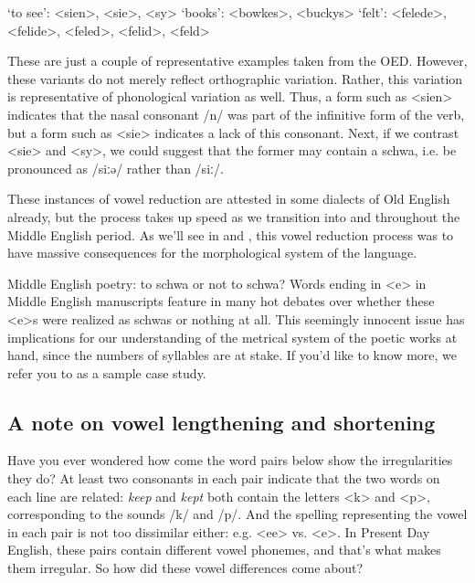 \begin{exe}
    \ex `to see': <sien>, <sie>, <sy>
    \ex `books': <bowkes>, <buckys>
    \ex `felt': <felede>, <felide>, <feled>, <felid>, <feld>
\end{exe}

\noindent These are just a couple of representative examples taken from the OED. However, these variants do not merely reflect orthographic variation. Rather, this variation is representative of phonological variation as well. Thus, a form such as <sien> indicates that the nasal consonant /n/ was part of the infinitive form of the verb, but a form such as <sie> indicates a lack of this consonant. Next, if we contrast <sie> and <sy>, we could suggest that the former may contain a schwa, i.e. be pronounced as /siːə/ rather than /siː/. 

These instances of vowel reduction are attested in some dialects of Old English already, but the process takes up speed as we transition into and throughout the Middle English period. As we'll see in  and , this vowel reduction process was to have massive consequences for the morphological system of the language.


\begin{sourcebox}{Middle English poetry: to schwa or not to schwa?}
Words ending in <e> in Middle English manuscripts feature in many hot debates over whether these <e>s were realized as schwas or nothing at all. This seemingly innocent issue has implications for our understanding of the metrical system of the poetic works at hand, since the numbers of syllables are at stake. If you'd like to know more, we refer you to \citet{Duffell2000} as a sample case study.
\end{sourcebox}


\subsection{A note on vowel lengthening and shortening}\label{ME-lengthening}
Have you ever wondered how come the word pairs below show the irregularities they do? At least two consonants in each pair indicate that the two words on each line are related: \textit{keep} and \textit{kept} both contain the letters <k> and <p>, corresponding to the sounds /k/ and /p/. And the spelling representing the vowel in each pair is not too dissimilar either: e.g. <ee> vs. <e>. In Present Day English, these pairs contain different vowel phonemes, and that's what makes them irregular. So how did these vowel differences come about?

